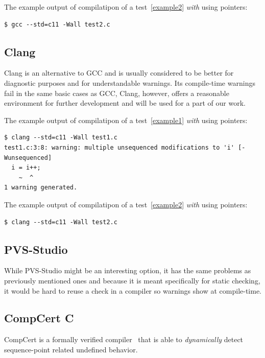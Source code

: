 The example output of compilatipon of a test~\ref{example2} \emph{with} using pointers:
\begin{lstlisting}
$ gcc --std=c11 -Wall test2.c 
\end{lstlisting}
\subsection{Clang}
Clang is an alternative to GCC and is usually considered to be better for diagnostic purposes and for understandable warnings. Its compile-time warnings fail in the same basic cases as GCC, Clang, however, offers a reasonable environment for further development and will be used for a part of our work.

The example output of compilatipon of a test~\ref{example1} \emph{with} using pointers:
\begin{lstlisting}
$ clang --std=c11 -Wall test1.c 
test1.c:3:8: warning: multiple unsequenced modifications to 'i' [-Wunsequenced]
  i = i++;
    ~  ^
1 warning generated.
\end{lstlisting}

The example output of compilatipon of a test~\ref{example2} \emph{with} using pointers:
\begin{lstlisting}
$ clang --std=c11 -Wall test2.c 
\end{lstlisting}
\subsection{PVS-Studio}
While PVS-Studio might be an interesting option, it has the same problems as previously mentioned ones and because it is meant specifically for static checking, it would be hard to reuse a check in a compiler so warnings show at compile-time.
\subsection{CompCert C}
CompCert is a formally verified compiler~\cite{CompCert} that is able to \emph{dynamically} detect sequence-point related undefined behavior.
